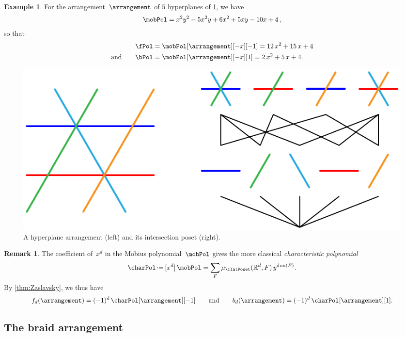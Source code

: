 \documentclass{amsart}
\newcommand{\darkblue}{\color{darkblue}} %
\theoremstyle{definition}
\newtheorem{example}[theorem]{Example}
\newtheorem{remark}[theorem]{Remark}
\newcommand{\R}{\mathbb{R}} %
\newcommand{\eqdef}{\mbox{\,\raisebox{0.2ex}{\scriptsize\ensuremath{\mathrm:}}\ensuremath{=}\,}} %
\newcommand{\defn}[1]{\textsl{\darkblue #1}} %
\begin{document}
\begin{example}
For the arrangement~$\arrangement$ of $5$ hyperplanes of \cref{fig:arrangement}, we have
\[
\mobPol = x^2y^2 - 5x^2y + 6x^2 + 5xy - 10x + 4 \, ,
\]
so that
\begin{align*}
\fPol & = \mobPol[\arrangement][-x][-1] = 12 \, x^2 + 15 \, x + 4 \\
\text{and}\qquad
\bPol & = \mobPol[\arrangement][-x][1] = 2 \, x^2 + 5 \, x + 4.
\end{align*}
%
\begin{figure}
	\includegraphics[scale=.9]{intersectionPoset}
	\caption{A hyperplane arrangement (left) and its intersection poset (right).}
	\label{fig:arrangement}
\end{figure}
\end{example}

\begin{remark}
\label{rem:characteristicPolynomial}
The coefficient of~$x^d$ in the M\"obius polynomial~$\mobPol$ gives the more classical \defn{characteristic polynomial}
\[
\charPol \eqdef [x^d] \, \mobPol = \sum_F \mu_{\flatPoset}(\R^d,F) \, y^{\dim(F)}.
\]
By \cref{thm:Zaslavsky}, we thus have
\[
f_d(\arrangement) = (-1)^d \, \charPol[\arrangement][-1] 
\qquad\text{and}\qquad
b_d(\arrangement) = (-1)^d \, \charPol[\arrangement][1].
\]
\end{remark}


\subsection{The braid arrangement}
\label{subsec:braidArrangement}
\end{document}
